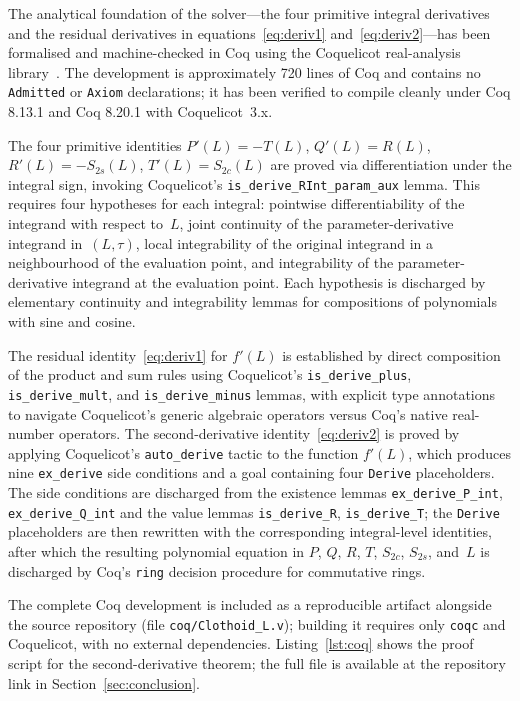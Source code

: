 \documentclass[11pt,a4paper]{article}
\begin{document}
The analytical foundation of the solver---the four primitive integral derivatives and the residual derivatives in equations~\eqref{eq:deriv1} and~\eqref{eq:deriv2}---has been formalised and machine-checked in Coq using the Coquelicot real-analysis library~\citep{Boldo2015}. The development is approximately 720 lines of Coq and contains no \texttt{Admitted} or \texttt{Axiom} declarations; it has been verified to compile cleanly under Coq 8.13.1 and Coq 8.20.1 with Coquelicot~3.x.

The four primitive identities $P'(L) = -T(L)$, $Q'(L) = R(L)$, $R'(L) = -S_{2s}(L)$, $T'(L) = S_{2c}(L)$ are proved via differentiation under the integral sign, invoking Coquelicot's \texttt{is\_derive\_RInt\_param\_aux} lemma. This requires four hypotheses for each integral: pointwise differentiability of the integrand with respect to~$L$, joint continuity of the parameter-derivative integrand in~$(L,\tau)$, local integrability of the original integrand in a neighbourhood of the evaluation point, and integrability of the parameter-derivative integrand at the evaluation point. Each hypothesis is discharged by elementary continuity and integrability lemmas for compositions of polynomials with sine and cosine.

The residual identity~\eqref{eq:deriv1} for $f'(L)$ is established by direct composition of the product and sum rules using Coquelicot's \texttt{is\_derive\_plus}, \texttt{is\_derive\_mult}, and \texttt{is\_derive\_minus} lemmas, with explicit type annotations to navigate Coquelicot's generic algebraic operators versus Coq's native real-number operators. The second-derivative identity~\eqref{eq:deriv2} is proved by applying Coquelicot's \texttt{auto\_derive} tactic to the function $f'(L)$, which produces nine \texttt{ex\_derive} side conditions and a goal containing four \texttt{Derive} placeholders. The side conditions are discharged from the existence lemmas \texttt{ex\_derive\_P\_int}, \texttt{ex\_derive\_Q\_int} and the value lemmas \texttt{is\_derive\_R}, \texttt{is\_derive\_T}; the \texttt{Derive} placeholders are then rewritten with the corresponding integral-level identities, after which the resulting polynomial equation in $P$, $Q$, $R$, $T$, $S_{2c}$, $S_{2s}$, and~$L$ is discharged by Coq's \texttt{ring} decision procedure for commutative rings.

The complete Coq development is included as a reproducible artifact alongside the source repository (file \texttt{coq/Clothoid\_L.v}); building it requires only \texttt{coqc} and Coquelicot, with no external dependencies. Listing~\ref{lst:coq} shows the proof script for the second-derivative theorem; the full file is available at the repository link in Section~\ref{sec:conclusion}.
\end{document}
